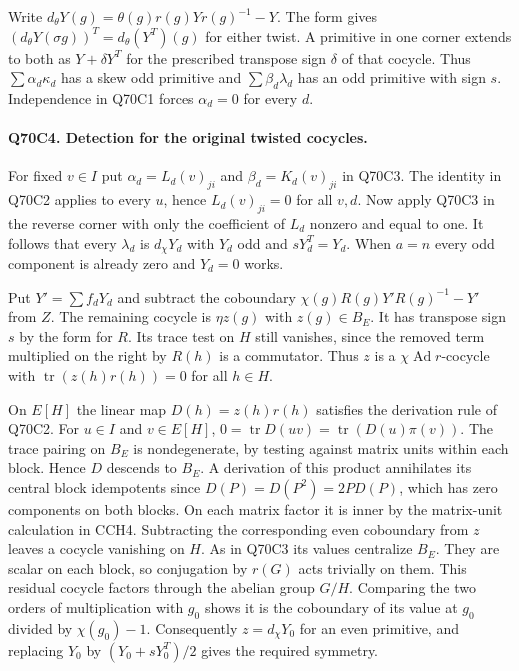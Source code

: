 Write $d_\theta Y(g)=\theta(g)r(g)Yr(g)^{-1}-Y$. The form gives
$(d_\theta Y(\sigma g))^T=d_\theta(Y^T)(g)$ for either twist. A primitive in
one corner extends to both as $Y+\delta Y^T$ for the prescribed
transpose sign $\delta$ of that cocycle. Thus $\sum\alpha_d\kappa_d$
has a skew odd primitive and $\sum\beta_d\lambda_d$ has an odd
primitive with sign $s$. Independence in Q70C1 forces
$\alpha_d=0$ for every $d$.

\paragraph{Q70C4. Detection for the original twisted cocycles.}
For fixed $v\in I$ put $\alpha_d=L_d(v)_{ji}$ and
$\beta_d=K_d(v)_{ji}$ in Q70C3. The identity in Q70C2 applies
to every $u$, hence $L_d(v)_{ji}=0$ for all $v,d$. Now apply
Q70C3 in the reverse corner with only the coefficient of $L_d$
nonzero and equal to one. It follows that every $\lambda_d$ is
$d_\chi Y_d$ with $Y_d$ odd and $sY_d^T=Y_d$.
When $a=n$ every odd component is already zero and $Y_d=0$ works.

Put $Y'=\sum f_dY_d$ and subtract the coboundary
$\chi(g)R(g)Y'R(g)^{-1}-Y'$ from $Z$. The remaining cocycle is
$\eta z(g)$ with $z(g)\in B_E$. It has transpose sign $s$ by
the form for $R$. Its trace test on $H$ still vanishes, since
the removed term multiplied on the right by $R(h)$ is a
commutator. Thus $z$ is a $\chi\operatorname{Ad}r$-cocycle with
$\operatorname{tr}(z(h)r(h))=0$ for all $h\in H$.

On $E[H]$ the linear map $D(h)=z(h)r(h)$ satisfies the derivation
rule of Q70C2. For $u\in I$ and $v\in E[H]$,
$0=\operatorname{tr}D(uv)=\operatorname{tr}(D(u)\pi(v))$.
The trace pairing on $B_E$ is nondegenerate, by testing against
matrix units within each block. Hence $D$ descends to $B_E$.
A derivation of this product annihilates its central block idempotents since
$D(P)=D(P^2)=2P D(P)$, which has zero components on both
blocks. On each matrix factor it is inner by the matrix-unit
calculation in CCH4. Subtracting the corresponding even coboundary
from $z$ leaves a cocycle vanishing on $H$. As in Q70C3 its values
centralize $B_E$. They are scalar on each block, so conjugation
by $r(G)$ acts trivially on them. This residual cocycle factors
through the abelian group $G/H$. Comparing the two orders of
multiplication with $g_0$ shows it is the coboundary of its
value at $g_0$ divided by $\chi(g_0)-1$. Consequently
$z=d_\chi Y_0$ for an even primitive, and replacing $Y_0$ by
$(Y_0+sY_0^T)/2$ gives the required symmetry.

